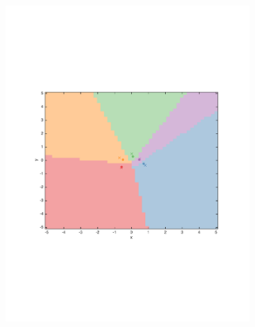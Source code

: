 \documentclass[preprint, 12pt]{elsarticle}
\begin{document}
\begin{figure}[htp!]
	\begin{subfigure}[t]{0.45\textwidth}
		\includegraphics[width=\textwidth, trim={15mm 75mm 20mm 75mm}]{Graphics/marketarea_mu05_nratio2.pdf}
		\caption[.]{}
		\label{fig:marketarea_mu05}
	\end{subfigure}
	~
	\begin{subfigure}[t]{0.45\textwidth}

\end{subfigure}
\end{figure}
\end{document}
